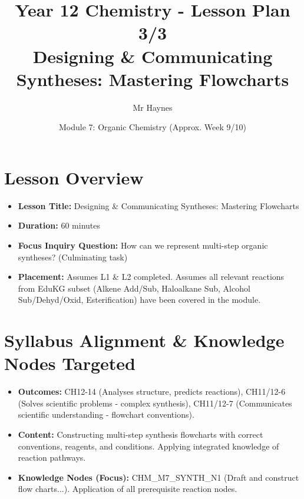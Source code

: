 \documentclass[11pt, a4paper]{article}
\title{Year 12 Chemistry - Lesson Plan 3/3 \\ Designing \& Communicating Syntheses: Mastering Flowcharts}
\date{Module 7: Organic Chemistry (Approx. Week 9/10)}
\author{Mr Haynes} %
\begin{document}
\maketitle
\vspace{-2em} %

\section*{Lesson Overview}
\begin{itemize}
    \item \textbf{Lesson Title:} Designing \& Communicating Syntheses: Mastering Flowcharts
    \item \textbf{Duration:} 60 minutes
    \item \textbf{Focus Inquiry Question:} How can we represent multi-step organic syntheses? (Culminating task)
    \item \textbf{Placement:} Assumes L1 \& L2 completed. Assumes all relevant reactions from EduKG subset (Alkene Add/Sub, Haloalkane Sub, Alcohol Sub/Dehyd/Oxid, Esterification) have been covered in the module.
\end{itemize}

\section*{Syllabus Alignment \& Knowledge Nodes Targeted}
\begin{itemize}
    \item \textbf{Outcomes:} CH12-14 (Analyses structure, predicts reactions), CH11/12-6 (Solves scientific problems - complex synthesis), CH11/12-7 (Communicates scientific understanding - flowchart conventions).
    \item \textbf{Content:} Constructing multi-step synthesis flowcharts with correct conventions, reagents, and conditions. Applying integrated knowledge of reaction pathways.
    \item \textbf{Knowledge Nodes (Focus):} CHM\_M7\_SYNTH\_N1 (Draft and construct flow charts...). Application of all prerequisite reaction nodes.
\end{itemize}
\end{document}
